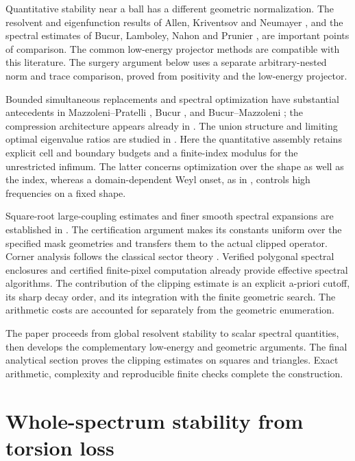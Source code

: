 \documentclass[11pt,reqno]{amsart}
\numberwithin{equation}{section}
\begin{document}
Quantitative stability near a ball has a different geometric
normalization. The resolvent and eigenfunction results of
Allen, Kriventsov and Neumayer
\cite{AllenKriventsovNeumayer2025}, and the spectral estimates of
Bucur, Lamboley, Nahon and Prunier \cite{BucurEtAl2026}, are
important points of comparison. The common low-energy projector
methods are compatible with this literature. The surgery argument below
uses a separate arbitrary-nested norm and trace comparison, proved
from positivity and the low-energy projector.

Bounded simultaneous replacements and spectral optimization have
substantial antecedents in Mazzoleni--Pratelli
\cite{MazzoleniPratelli2013}, Bucur \cite{Bucur2012}, and
Bucur--Mazzoleni \cite{BucurMazzoleni2015}; the compression
architecture appears already in \cite{Bucur2003}.
The union structure and limiting optimal eigenvalue ratios are
studied in \cite{ColboisElSoufi2014,FreitasLagacePayette2021}.
Here the quantitative assembly retains explicit cell and boundary
budgets and a finite-index modulus for the unrestricted infimum.
The latter concerns optimization over the shape as well as the
index, whereas a domain-dependent Weyl onset, as in
\cite{JiangLin2026}, controls high frequencies on a fixed shape.

Square-root large-coupling estimates and finer smooth spectral
expansions are established in
\cite{BruneauCarbou2002,Agbanusi2015}.
The certification argument makes its constants uniform over the
specified mask geometries and transfers them to the actual clipped
operator. Corner analysis follows the classical sector theory
\cite{Dauge2018}. Verified polygonal spectral enclosures
\cite{LiuOishi2013} and certified finite-pixel computation
\cite{RoslerStepanenko2024} already provide effective spectral
algorithms. The contribution of the clipping estimate is an
explicit a-priori cutoff, its sharp decay order, and its integration
with the finite geometric search. The arithmetic costs are
accounted for separately from the geometric enumeration.

The paper proceeds from global resolvent stability to scalar
spectral quantities, then develops the complementary low-energy
and geometric arguments. The final analytical section proves the
clipping estimates on squares and triangles. Exact arithmetic,
complexity and reproducible finite checks complete the
construction.



\section{Whole-spectrum stability from torsion loss}\label{op:stability}
\end{document}
